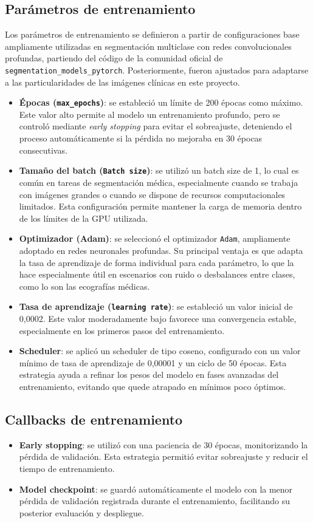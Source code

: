 \subsection{Parámetros de entrenamiento}
Los parámetros de entrenamiento se definieron a partir de configuraciones base ampliamente utilizadas en segmentación multiclase con redes convolucionales profundas, partiendo del código de la comunidad oficial de \texttt{segmentation\_models\_pytorch}. Posteriormente, fueron ajustados para adaptarse a las particularidades de las imágenes clínicas en este proyecto.
\begin{itemize}
    \item \textbf{Épocas (\texttt{max\_epochs})}: se estableció un límite de 200 épocas como máximo. Este valor alto permite al modelo un entrenamiento profundo, pero se controló mediante \textit{early stopping} para evitar el sobreajuste, deteniendo el proceso automáticamente si la pérdida no mejoraba en 30 épocas consecutivas. 
    \item \textbf{Tamaño del batch (\texttt{Batch size})}: se utilizó un batch size de 1, lo cual es común en tareas de segmentación médica, especialmente cuando se trabaja con imágenes grandes o cuando se dispone de recursos computacionales limitados. Esta configuración permite mantener la carga de memoria dentro de los límites de la GPU utilizada.
    \item \textbf{Optimizador (Adam)}: se seleccionó el optimizador \texttt{Adam}, ampliamente adoptado en redes neuronales profundas. Su principal ventaja es que adapta la tasa de aprendizaje de forma individual para cada parámetro, lo que la hace especialmente útil en escenarios con ruido o desbalances entre clases, como lo son las ecografías médicas.
    \item \textbf{Tasa de aprendizaje (\texttt{learning rate})}: se estableció un valor inicial de 0,0002. Este valor moderadamente bajo favorece una convergencia estable, especialmente en los primeros pasos del entrenamiento. 
    \item \textbf{Scheduler}: se aplicó un scheduler de tipo coseno, configurado con un valor mínimo de tasa de aprendizaje de 0,00001 y un ciclo de 50 épocas. Esta estrategia ayuda a refinar los pesos del modelo en fases avanzadas del entrenamiento, evitando que quede atrapado en mínimos poco óptimos.
\end{itemize}
\subsection{Callbacks de entrenamiento}
\begin{itemize}
    \item \textbf{Early stopping}: se utilizó con una paciencia de 30 épocas, monitorizando la pérdida de validación. Esta estrategia permitió evitar sobreajuste y reducir el tiempo de entrenamiento.
     \item \textbf{Model checkpoint}: se guardó automáticamente el modelo con la menor pérdida de validación registrada durante el entrenamiento, facilitando su posterior evaluación y despliegue.
\end{itemize}

